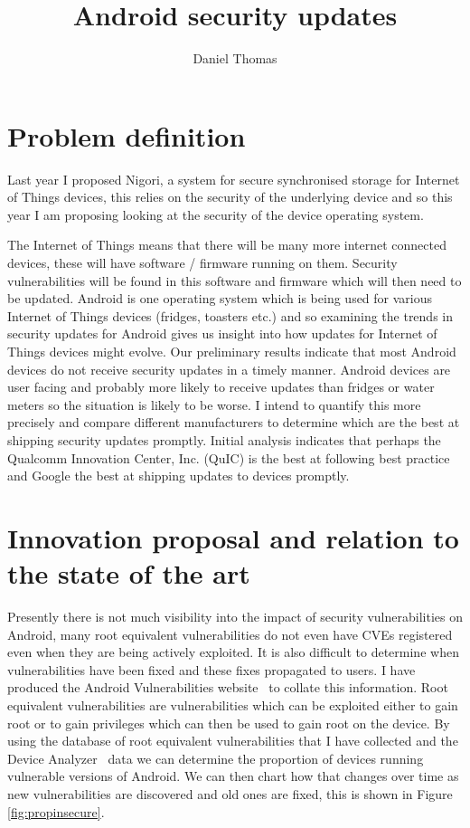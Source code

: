 \documentclass[a4paper,twocolumn]{article}
\author{Daniel Thomas}
\title{Android security updates}
\date{}%
\begin{document}
\maketitle

\section*{Problem definition}
Last year I proposed Nigori, a system for secure synchronised storage for Internet of Things devices, this relies on the security of the underlying device and so this year I am proposing looking at the security of the device operating system.

The Internet of Things means that there will be many more internet connected devices, these will have software / firmware running on them.
Security vulnerabilities will be found in this software and firmware which will then need to be updated.
Android is one operating system which is being used for various Internet of Things devices (fridges, toasters etc.) and so examining the trends in security updates for Android gives us insight into how updates for Internet of Things devices might evolve.
Our preliminary results indicate that most Android devices do not receive security updates in a timely manner.
Android devices are user facing and probably more likely to receive updates than fridges or water meters so the situation is likely to be worse.
I intend to quantify this more precisely and compare different manufacturers to determine which are the best at shipping security updates promptly.
Initial analysis indicates that perhaps the Qualcomm Innovation Center, Inc. (QuIC) is the best at following best practice~\cite{codeaurora-security-advisories} and Google the best at shipping updates to devices promptly.


\section*{Innovation proposal and relation to the state of the art}
Presently there is not much visibility into the impact of security vulnerabilities on Android, many root equivalent vulnerabilities do not even have CVEs registered even when they are being actively exploited.
It is also difficult to determine when vulnerabilities have been fixed and these fixes propagated to users.
I have produced the Android Vulnerabilities website~\cite{androidvulnerabilities.org} to collate this information.
Root equivalent vulnerabilities are vulnerabilities which can be exploited either to gain root or to gain privileges which can then be used to gain root on the device.
By using the database of root equivalent vulnerabilities that I have collected and the Device Analyzer~\cite{Wagner2013} data we can determine the proportion of devices running vulnerable versions of Android.
We can then chart how that changes over time as new vulnerabilities are discovered and old ones are fixed, this is shown in Figure \ref{fig:propinsecure}.
\end{document}
